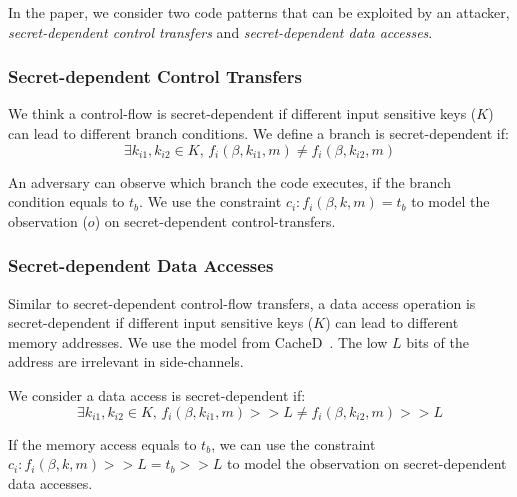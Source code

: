 In the paper, we consider two code patterns that can be exploited by an attacker,
\emph{secret-dependent control transfers} and \emph{secret-dependent data
accesses}. 

\subsubsection{Secret-dependent Control Transfers}
We think a control-flow is secret-dependent if different input sensitive keys
($K$) can lead to different branch conditions. 
We define a branch is secret-dependent if:
$$\exists k_{i1}, k_{i2} \in K, \,f_i(\beta, k_{i1}, m) \neq f_i(\beta, k_{i2}, m)$$

An adversary can observe which branch the code executes, if the branch condition
equals to $t_b$. We use the constraint $c_i : f_i(\beta, k, m) = t_b$ to model
the observation ($o$) on secret-dependent control-transfers.

\subsubsection{Secret-dependent Data Accesses}
Similar to secret-dependent control-flow transfers, a data access operation is
secret-dependent if different input sensitive keys ($K$) can lead to different
memory addresses. We use the model from CacheD~\cite{203878}. The low $L$ bits
of the address are irrelevant in side-channels.

We consider a data access is secret-dependent if:
$$\exists k_{i1}, k_{i2} \in K, \,f_i(\beta, k_{i1}, m) >> L \neq f_i(\beta, k_{i2}, m) >> L$$

If the memory access equals to $t_b$, we can use the constraint $c_i :
f_i(\beta, k, m) >> L = t_b >> L$ to model the observation on secret-dependent
data accesses.

